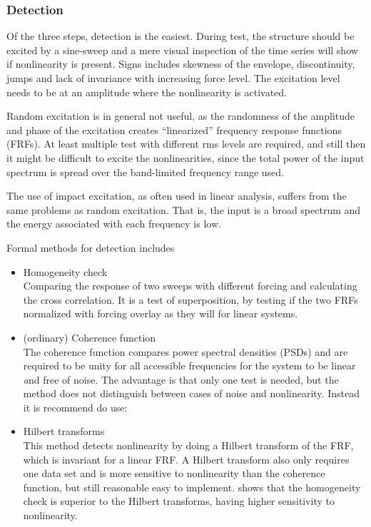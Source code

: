 

\subsubsection{Detection}

Of the three steps, detection is the easiest. During test, the structure should
be excited by a sine-sweep and a mere visual inspection of the time series will
show if nonlinearity is present. Signs includes skewness of the envelope,
discontinuity, jumps and lack of invariance with increasing force level. The
excitation level needs to be at an amplitude where the nonlinearity is
activated.

Random excitation is in general not useful, as the randomness of the amplitude
and phase of the excitation creates ``linearized'' frequency response functions
(FRFs). At least multiple test with different rms levels are required, and still
then it might be difficult to excite the nonlinearities, since the total power
of the input spectrum is spread over the band-limited frequency range used.

The use of impact excitation, as often used in linear analysis, suffers from the
same problems as random excitation. That is, the input is a broad spectrum and
the energy associated with each frequency is low.


Formal methods for detection includes

\begin{itemize}
\item Homogeneity check \\
  Comparing the response of two sweeps with different forcing and calculating
  the cross correlation. It is a test of superposition, by testing if the two FRFs
  normalized with forcing overlay as they will for linear systems.
\item (ordinary) Coherence function \\
  The coherence function compares power spectral densities (PSDs) and are
  required to be unity for all accessible frequencies for the system to be
  linear {\textit and} free of noise. The advantage is that only one test is needed,
  but the method does not distinguish between cases of noise and
  nonlinearity. Instead it is recommend do use:
\item Hilbert transforms \\
  This method detects nonlinearity by doing a Hilbert transform of the FRF,
  which is invariant for a linear FRF.
  A Hilbert transform also only requires one data set and is more sensitive to
  nonlinearity than the coherence function, but still reasonable easy to
  implement. \textcite{kragh2010a} shows that the homogeneity check is superior to
  the Hilbert transforms, having higher sensitivity to nonlinearity.
\end{itemize}

